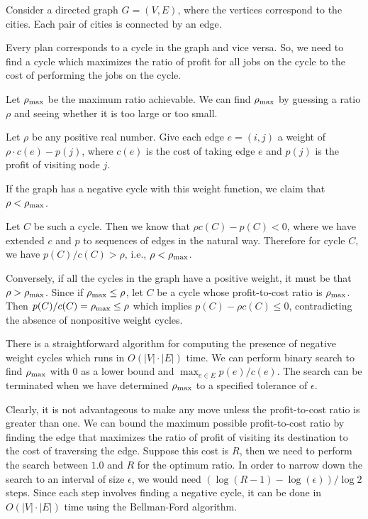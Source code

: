 Consider a directed graph $G=(V,E)$, where the vertices correspond to the cities.
Each pair of cities is connected by an edge.

Every plan corresponds to a cycle in the graph and vice versa.  So, we 
need to find a cycle which maximizes the ratio of profit for
all jobs on the cycle to the cost of performing the jobs on the cycle.

Let $\rho_{\mbox{\scriptsize max}}$ be the maximum ratio 
achievable. We can find $\rho_{\mbox{\scriptsize max}}$ by guessing
a ratio $\rho$ and seeing whether it is too large or too small.

Let $\rho$ be any positive real number.  Give each edge $e = (i,j)$ a
weight of $\rho \cdot c(e) - p(j)$,
where $c(e)$ is the cost of taking edge $e$ and $p(j)$ is the profit
of visiting node $j$.

If the graph has a negative cycle with this weight function, we claim that 
$\rho < \rho_{\mbox{\scriptsize max}}$. 

Let $C$ be such a cycle.  Then we know that $\rho c(C) - p(C) < 0$, where we
have extended $c$ and $p$ to sequences of edges in the natural way.
Therefore for cycle $C$, we have $p(C)/c(C) > \rho$, i.e., $\rho < \rho_{\mbox{\scriptsize max}}$.

Conversely, if all the cycles in the graph have a positive weight, it must be
that $\rho > \rho_{\mbox{\scriptsize max}}$. Since if $\rho_{\mbox{\scriptsize max}} \leq \rho$, let $C$ be a cycle
whose profit-to-cost ratio is $\rho_{\mbox{\scriptsize max}}$. Then $p(C)/c(C) = \rho_{\mbox{\scriptsize max}} \leq \rho$
which implies $p(C) -\rho c(C) \leq 0$, contradicting the absence of 
nonpositive weight cycles.

There is a straightforward algorithm for computing the presence of 
negative weight cycles which runs in $O(|V|\cdot |E|)$ time. We can perform
binary search to find $\rho_{\mbox{\scriptsize max}}$ with $0$ as a lower bound and $\max_{e\in E} p(e)/c(e)$.
The search can be terminated when we have determined $\rho_{\mbox{\scriptsize max}}$ to a specified
tolerance of $\epsilon$.

Clearly, it is not advantageous to make any move unless the profit-to-cost
ratio is greater than one. We can bound the maximum possible profit-to-cost ratio by finding the edge that maximizes the ratio of profit of
visiting its destination  to the
cost of traversing the edge. Suppose this cost is $R$, then we need to perform the search
between $1.0$ and $R$ for the optimum ratio. In order to narrow down
the search to an interval of size $\epsilon$, we would need $(\log (R-1)
- \log(\epsilon))/\log 2$ steps. Since each step involves finding a
negative cycle, it can be done in $O(|V|\cdot|E|)$ time using the 
Bellman-Ford algorithm.

